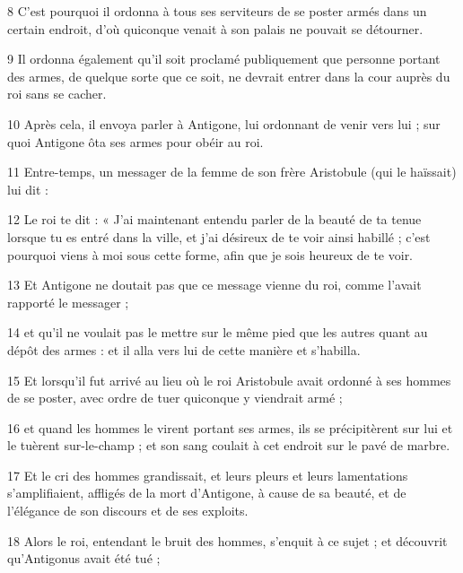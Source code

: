 \par 8 C'est pourquoi il ordonna à tous ses serviteurs de se poster armés dans un certain endroit, d'où quiconque venait à son palais ne pouvait se détourner.

\par 9 Il ordonna également qu'il soit proclamé publiquement que personne portant des armes, de quelque sorte que ce soit, ne devrait entrer dans la cour auprès du roi sans se cacher.

\par 10 Après cela, il envoya parler à Antigone, lui ordonnant de venir vers lui ; sur quoi Antigone ôta ses armes pour obéir au roi.

\par 11 Entre-temps, un messager de la femme de son frère Aristobule (qui le haïssait) lui dit :

\par 12 Le roi te dit : « J'ai maintenant entendu parler de la beauté de ta tenue lorsque tu es entré dans la ville, et j'ai désireux de te voir ainsi habillé ; c'est pourquoi viens à moi sous cette forme, afin que je sois heureux de te voir.

\par 13 Et Antigone ne doutait pas que ce message vienne du roi, comme l'avait rapporté le messager ;

\par 14 et qu'il ne voulait pas le mettre sur le même pied que les autres quant au dépôt des armes : et il alla vers lui de cette manière et s'habilla.

\par 15 Et lorsqu'il fut arrivé au lieu où le roi Aristobule avait ordonné à ses hommes de se poster, avec ordre de tuer quiconque y viendrait armé ;

\par 16 et quand les hommes le virent portant ses armes, ils se précipitèrent sur lui et le tuèrent sur-le-champ ; et son sang coulait à cet endroit sur le pavé de marbre.

\par 17 Et le cri des hommes grandissait, et leurs pleurs et leurs lamentations s'amplifiaient, affligés de la mort d'Antigone, à cause de sa beauté, et de l'élégance de son discours et de ses exploits.

\par 18 Alors le roi, entendant le bruit des hommes, s'enquit à ce sujet ; et découvrit qu'Antigonus avait été tué ;

